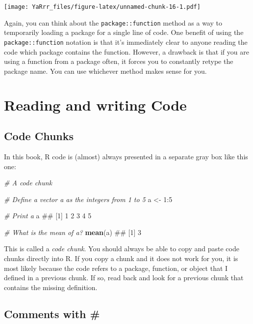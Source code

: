 \documentclass[]{book}
\newenvironment{Shaded}{\begin{snugshade}}{\end{snugshade}}
\newcommand{\KeywordTok}[1]{\textcolor[rgb]{0.13,0.29,0.53}{\textbf{{#1}}}}
\newcommand{\DecValTok}[1]{\textcolor[rgb]{0.00,0.00,0.81}{{#1}}}
\newcommand{\StringTok}[1]{\textcolor[rgb]{0.31,0.60,0.02}{{#1}}}
\newcommand{\CommentTok}[1]{\textcolor[rgb]{0.56,0.35,0.01}{\textit{{#1}}}}
\newcommand{\NormalTok}[1]{{#1}}
\theoremstyle{definition}
\theoremstyle{definition}
\theoremstyle{remark}
\begin{document}
\texttt{[image: YaRrr\_files/figure-latex/unnamed-chunk-16-1.pdf]}

Again, you can think about the \texttt{package::function} method as a
way to temporarily loading a package for a single line of code. One
benefit of using the \texttt{package::function} notation is that it's
immediately clear to anyone reading the code which package contains the
function. However, a drawback is that if you are using a function from a
package often, it forces you to constantly retype the package name. You
can use whichever method makes sense for you.

\section{Reading and writing Code}\label{reading-and-writing-code}

\subsection{Code Chunks}\label{code-chunks}

In this book, R code is (almost) always presented in a separate gray box
like this one:

\begin{Shaded}
\begin{Highlighting}[]
\CommentTok{# A code chunk}

\CommentTok{# Define a vector a as the integers from 1 to 5}
\NormalTok{a <-}\StringTok{ }\DecValTok{1}\NormalTok{:}\DecValTok{5}

\CommentTok{# Print a}
\NormalTok{a}
\NormalTok{## [1] 1 2 3 4 5}

\CommentTok{# What is the mean of a?}
\KeywordTok{mean}\NormalTok{(a)}
\NormalTok{## [1] 3}
\end{Highlighting}
\end{Shaded}

This is called a \emph{code chunk}. You should always be able to copy
and paste code chunks directly into R. If you copy a chunk and it does
not work for you, it is most likely because the code refers to a
package, function, or object that I defined in a previous chunk. If so,
read back and look for a previous chunk that contains the missing
definition.

\subsection{Comments with \#}\label{comments-with}
\end{document}
